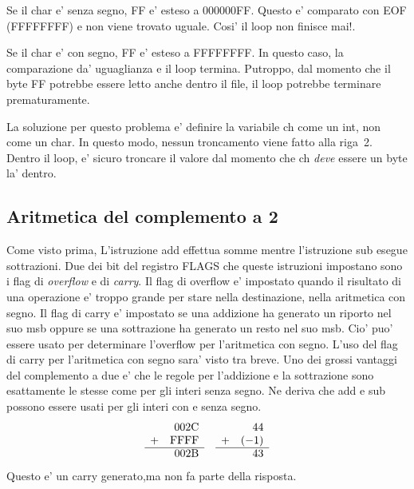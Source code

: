 Se il {\code char} e' senza segno, {\code FF} e' esteso a {\code 000000FF}.
Questo e' comparato con {\code EOF} ({\code FFFFFFFF}) e non viene 
trovato uguale. Cosi' il loop non finisce mai!.

Se il {\code char} e' con segno, {\code FF} e' esteso a {\code FFFFFFFF}.
In questo caso, la comparazione da' uguaglianza e il loop termina. Putroppo, 
dal momento che il byte {\code FF} potrebbe essere letto anche dentro
il file, il loop potrebbe terminare prematuramente.

La soluzione per questo problema e' definire la variabile {\code ch} come 
un {\code int}, non come un {\code char}. In questo modo, nessun troncamento
viene fatto alla riga~2. Dentro il loop, e' sicuro troncare il valore dal 
momento che {\code ch} \emph{deve} essere un byte la' dentro.


\subsection{Aritmetica del complemento a 2 }

Come visto prima, L'istruzione {\code add} effettua somme mentre 
l'istruzione {\code sub} esegue sottrazioni. Due dei bit del registro
FLAGS che queste istruzioni impostano sono i flag di \emph{overflow}
e di \emph{carry}. Il flag di overflow e' impostato quando il risultato 
di una operazione e' troppo grande per stare nella destinazione, nella
aritmetica con segno. Il flag di carry e' impostato se una addizione ha
generato un riporto nel suo msb oppure se una sottrazione ha generato un 
resto nel suo msb. Cio' puo' essere usato per determinare l'overflow
per l'aritmetica con segno. L'uso del flag di carry per l'aritmetica
con segno sara' visto tra breve. Uno dei grossi vantaggi del 
complemento a due e' che le regole per l'addizione e la sottrazione
sono esattamente le stesse come per gli interi senza segno. Ne deriva
che {\code add} e {\code sub} possono essere usati per gli interi
con e senza segno.  
\[
\begin{array}{rrcrr}
 & 002\mathrm{C} & & & 44\\
+& \mathrm{FFFF} & &+&(-1)\\ \cline{1-2} \cline{4-5}
 & 002\mathrm{B} & & & 43
\end{array}
\]
Questo e' un carry generato,ma non fa parte della risposta.

